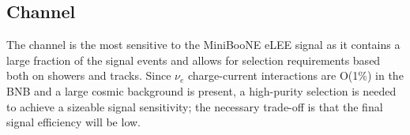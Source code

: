 {}

\subsection{\npsel Channel}
\label{sec:nueselection:1eNp}

The \npsel channel is the most sensitive to the MiniBooNE eLEE signal as it contains a large fraction of the signal events and allows for selection requirements based both on showers and tracks. Since $\nu_e$ charge-current interactions are O(1\%) in the BNB and a large cosmic background is present, a high-purity selection is needed to achieve a sizeable signal sensitivity; the necessary trade-off is that the final signal efficiency will be low.

